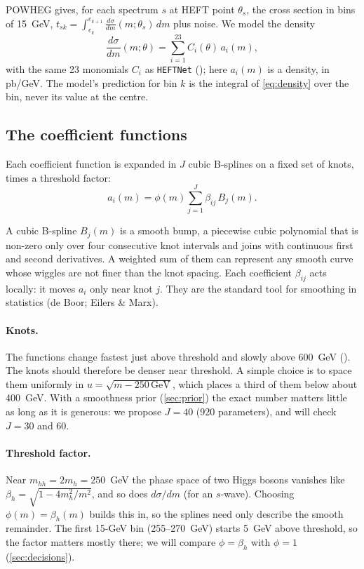 POWHEG gives, for each spectrum $s$ at HEFT point $\theta_s$, the cross section in bins of
15~GeV, $t_{sk} = \int_{e_k}^{e_{k+1}} \frac{d\sigma}{dm}(m;\theta_s)\,dm$ plus noise. We
model the density
\begin{equation}
  \frac{d\sigma}{dm}(m;\theta) = \sum_{i=1}^{23} C_i(\theta)\, a_i(m) ,
  \label{eq:density}
\end{equation}
with the same 23 monomials $C_i$ as \texttt{HEFTNet} (); here
$a_i(m)$ is a density, in pb/GeV. The model's prediction for bin $k$ is the integral of
\cref{eq:density} over the bin, never its value at the centre.

\subsection{The coefficient functions}

Each coefficient function is expanded in $J$ cubic B-splines on a fixed set of knots, times a
threshold factor:
\begin{equation}
  a_i(m) = \phi(m) \sum_{j=1}^{J} \beta_{ij}\, B_j(m) .
  \label{eq:spline}
\end{equation}

\begin{aside}
A cubic B-spline $B_j(m)$ is a smooth bump, a piecewise cubic polynomial that is non-zero only
over four consecutive knot intervals and joins with continuous first and second derivatives.
A weighted sum of them can represent any smooth curve whose wiggles are not finer than the
knot spacing. Each coefficient $\beta_{ij}$ acts locally: it moves $a_i$ only near knot $j$.
They are the standard tool for smoothing in statistics (de Boor; Eilers \& Marx).
\end{aside}

\paragraph{Knots.} The functions change fastest just above threshold and slowly above
600~GeV (). The knots should therefore be denser near
threshold. A simple choice is to space them uniformly in $u = \sqrt{m - 250\,\text{GeV}}$,
which places a third of them below about 400~GeV. With a smoothness prior
(\cref{sec:prior}) the exact number matters little as long as it is generous: we propose
$J = 40$ (920 parameters), and will check $J = 30$ and 60.

\paragraph{Threshold factor.} Near $m_{hh} = 2m_h = 250$~GeV the phase space of two Higgs
bosons vanishes like $\beta_h = \sqrt{1 - 4m_h^2/m^2}$, and so does $d\sigma/dm$ (for an
$s$-wave). Choosing $\phi(m) = \beta_h(m)$ builds this in, so the splines need only describe
the smooth remainder. The first 15-GeV bin (255--270~GeV) starts 5~GeV above threshold, so the
factor matters mostly there; we will compare $\phi = \beta_h$ with $\phi = 1$
(\cref{sec:decisions}).

